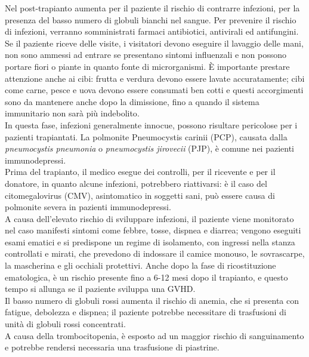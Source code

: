 Nel post-trapianto aumenta per il paziente il rischio di contrarre infezioni, per la presenza del basso numero 
di globuli bianchi nel sangue. Per prevenire il rischio di infezioni, verranno somministrati farmaci antibiotici, 
antivirali ed antifungini.\\ Se il paziente riceve delle visite, i visitatori devono eseguire il lavaggio delle mani, 
non sono ammessi ad entrare se presentano sintomi influenzali e non possono portare fiori o piante in quanto 
fonte di microrganismi. È importante prestare attenzione anche ai cibi: frutta e verdura devono essere 
lavate accuratamente; cibi come carne, pesce e uova devono essere consumati ben cotti e questi accorgimenti 
sono da mantenere anche dopo la dimissione, fino a quando il sistema immunitario non sarà più indebolito\cite{LLSBLOOD}.\\
In questa fase, infezioni generalmente innocue, possono risultare pericolose per i pazienti trapiantati. 
La polmonite Pneumocystis carinii (PCP), causata dalla \emph{pneumocystis pneumonia} o \emph{pneumocystis jirovecii} (PJP), 
è comune nei pazienti immunodepressi.\\
Prima del trapianto, il medico esegue dei controlli, per il ricevente e per il donatore, in quanto alcune 
infezioni, potrebbero riattivarsi: è il caso del citomegalovirus (CMV), asintomatico in soggetti sani, 
può essere causa di polmonite severa in pazienti immunodepressi\cite{STEMCELLS}.\\
A causa dell’elevato rischio di sviluppare infezioni, il paziente viene monitorato nel caso manifesti sintomi come 
febbre, tosse, dispnea e diarrea; vengono eseguiti esami ematici e si predispone un regime di isolamento, con 
ingressi nella stanza controllati e mirati, che prevedono di indossare il camice monouso, le sovrascarpe, 
la mascherina e gli occhiali protettivi.
Anche dopo la fase di ricostituzione ematologica, è un rischio presente fino a 6-12 mesi dopo il trapianto, e questo 
tempo si allunga se il paziente sviluppa una GVHD\cite{STEMCELLS}.\\

Il basso numero di globuli rossi aumenta il rischio di anemia, che si presenta con fatigue, debolezza e dispnea; 
il paziente potrebbe necessitare di trasfusioni di unità di globuli rossi concentrati\cite{LLSBLOOD}.\\
A causa della trombocitopenia, è esposto ad un maggior rischio di sanguinamento e potrebbe 
rendersi necessaria una trasfusione di piastrine\cite{LLSBLOOD}.\\

